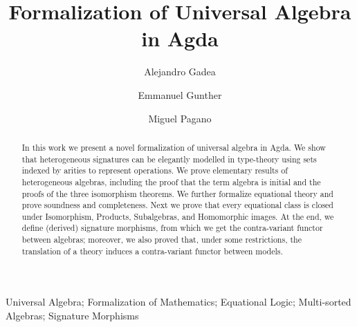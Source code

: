 \documentclass{msc}
\begin{document}


\title{Formalization of Universal Algebra in Agda}

\begin{authgrp}
  \author{Alejandro Gadea}
  \author{Emmanuel Gunther}
  \author{Miguel Pagano}

\end{authgrp}


\begin{abstract}
  In this work we present a novel formalization of universal algebra
  in Agda. We show that heterogeneous signatures can be elegantly
  modelled in type-theory using sets indexed by arities to represent
  operations. We prove elementary results of heterogeneous algebras,
  including the proof that the term algebra is initial and the proofs
  of the three isomorphism theorems. We further formalize equational
  theory and prove soundness and completeness. Next we prove that
  every equational class is closed under Isomorphism, Products,
  Subalgebras, and Homomorphic images. At the end, we define (derived)
  signature morphisms, from which we get the contra-variant functor
  between algebras; moreover, we also proved that, under some
  restrictions, the translation of a theory induces a contra-variant
  functor between models.
\end{abstract}

\begin{keywords}
  Universal Algebra; Formalization of Mathematics; Equational Logic; Multi-sorted Algebras; Signature Morphisms
\end{keywords}

\maketitle










\end{document}
